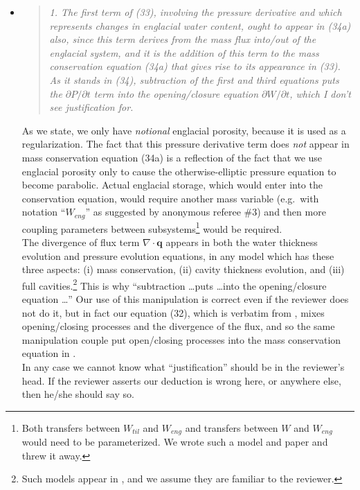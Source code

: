 \documentclass[11pt,reqno]{amsart}
\newcommand{\Div}{\ensuremath{\nabla\cdot}}
\newcommand{\reply}[2]{
\medskip\medskip
\item  \begin{quote}
\emph{#1}
\end{quote}

\medskip
\noindent #2}
\begin{document}
\begin{itemize}
\reply{1. The first term of (33), involving the pressure derivative and which represents
changes in englacial water content, ought to appear in (34a) also, since this term
derives from the mass flux into/out of the englacial system, and it is the addition
of this term to the mass conservation equation (34a) that gives rise to its appearance in (33).  As it stands in (34), subtraction of the first and third equations
puts the $\partial P/\partial t$ term into the opening/closure equation $\partial W/\partial t$, which I don't see justification for.}
{As we state, we only have \emph{notional} englacial porosity, because it is used as a regularization.  The fact that this pressure derivative term does \emph{not} appear in mass conservation equation (34a) is a reflection of the fact that we use englacial porosity only to cause the otherwise-elliptic pressure equation to become parabolic.  Actual englacial storage, which would enter into the conservation equation, would require another mass variable (e.g.~with notation ``$W_{eng}$'' as suggested by anonymous referee \#3) and then more coupling parameters between subsystems\footnote{Both transfers between $W_{til}$ and $W_{eng}$ and transfers between $W$ and $W_{eng}$ would need to be parameterized.  We wrote such a model and paper and threw it away.} would be required. \\
\indent The divergence of flux term $\Div\mathbf{q}$ appears in both the water thickness evolution and pressure evolution equations, in any model which has these three aspects: (i) mass conservation, (ii) cavity thickness evolution, and (iii) full cavities.\footnote{Such models appear in \cite{Hewitt2011,Hewittetal2012,Schoofetal2012,Werderetal2013}, and we assume they are familiar to the reviewer.}  This is why ``subtraction \dots puts \dots into the opening/closure equation \dots''  Our use of this manipulation is correct even if the reviewer does not do it, but in fact our equation (32), which is verbatim from \cite{Schoofetal2012}, mixes opening/closing processes and the divergence of the flux, and so the same manipulation couple put open/closing processes into the mass conservation equation in \cite{Schoofetal2012}. \\
\indent In any case we cannot know what ``justification'' should be in the reviewer's head.  If the reviewer asserts our deduction is wrong here, or anywhere else, then he/she should say so.}


\end{itemize}
\end{document}
